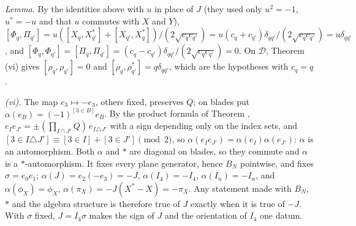 \emph{Lemma.} By the identities above with $u$ in place of $J$ (they used only $u^{2} = -1$, $u^{*} = -u$ and that $u$ commutes with $X$ and $Y$), $[\Phi_{q}, \Pi_{q'}] = u([X_{q}, X_{q'}^{*}] + [X_{q'}, X_{q}^{*}])/(2\sqrt{c_{q}c_{q'}}) = u(c_{q} + c_{q'})\delta_{qq'}/(2\sqrt{c_{q}c_{q'}}) = u\delta_{qq'}$, and $[\Phi_{q}, \Phi_{q'}] = [\Pi_{q}, \Pi_{q'}] = (c_{q} - c_{q'})\delta_{qq'}/(2\sqrt{c_{q}c_{q'}}) = 0$. On $\mathcal{D}$, Theorem (vi) gives $[\rho_{q}, \rho_{q'}] = 0$ and $[\rho_{q}, \rho_{q'}^{*}] = q\delta_{qq'}$, which are the hypotheses with $c_{q} = q$.

\emph{(vi).} The map $e_{3} \mapsto -e_{3}$, others fixed, preserves $Q$; on blades put $\alpha(e_{B}) = (-1)^{[3 \in B]}e_{B}$. By the product formula of Theorem , $e_{I}e_{J'} = \pm(\prod_{I \cap J'}Q)\,e_{I \triangle J'}$ with a sign depending only on the index sets, and $[3 \in I \triangle J'] \equiv [3 \in I] + [3 \in J'] \pmod 2$, so $\alpha(e_{I}e_{J'}) = \alpha(e_{I})\alpha(e_{J'})$: $\alpha$ is an automorphism. Both $\alpha$ and $*$ are diagonal on blades, so they commute and $\alpha$ is a $*$-automorphism. It fixes every plane generator, hence $B_{N}$ pointwise, and fixes $\sigma = e_{0}e_{1}$; $\alpha(J) = e_{2}(-e_{3}) = -J$, $\alpha(I_{4}) = -I_{4}$, $\alpha(I_{n}) = -I_{n}$, and $\alpha(\phi_{X}) = \phi_{X}$, $\alpha(\pi_{X}) = -J(X^{*} - X) = -\pi_{X}$. Any statement made with $B_{N}$, $*$ and the algebra structure is therefore true of $J$ exactly when it is true of $-J$. With $\sigma$ fixed, $J = I_{4}\sigma$ makes the sign of $J$ and the orientation of $I_{4}$ one datum.

